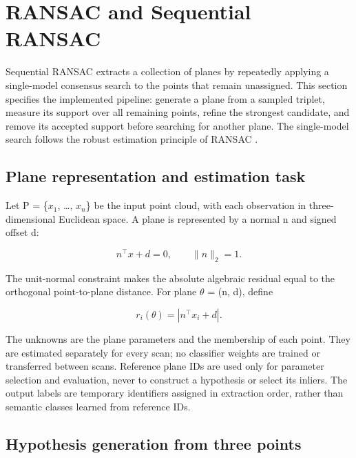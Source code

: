 \section{RANSAC and Sequential RANSAC}\label{ransac-and-sequential-ransac}

Sequential RANSAC extracts a collection of planes by repeatedly applying a single-model consensus search to the points that remain unassigned. This section specifies the implemented pipeline: generate a plane from a sampled triplet, measure its support over all remaining points, refine the strongest candidate, and remove its accepted support before searching for another plane. The single-model search follows the robust estimation principle of RANSAC \cite{fischler1981ransac}.

\subsection{Plane representation and estimation task}\label{plane-representation-and-estimation-task}

Let P = \{\(x_{1}\), \ldots, \(x_{n}\)\} be the input point cloud, with each observation in three-dimensional Euclidean space. A plane is represented by a normal n and signed offset d:

\begin{equation}
n^\top x+d=0,\qquad \|n\|_2=1.
\label{eq:1}
\end{equation}

The unit-normal constraint makes the absolute algebraic residual equal to the orthogonal point-to-plane distance. For plane \(\theta\) = (n, d), define

\begin{equation}
r_i(\theta)=|n^\top x_i+d|.
\label{eq:2}
\end{equation}

The unknowns are the plane parameters and the membership of each point. They are estimated separately for every scan; no classifier weights are trained or transferred between scans. Reference plane IDs are used only for parameter selection and evaluation, never to construct a hypothesis or select its inliers. The output labels are temporary identifiers assigned in extraction order, rather than semantic classes learned from reference IDs.

\subsection{Hypothesis generation from three points}\label{hypothesis-generation-from-three-points}

